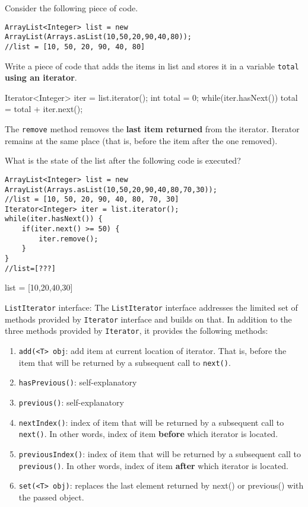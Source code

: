 \begin{questions}
\question Consider the following piece of code.

\begin{lstlisting}
ArrayList<Integer> list = new ArrayList(Arrays.asList(10,50,20,90,40,80));
//list = [10, 50, 20, 90, 40, 80]
\end{lstlisting}

Write a piece of code that adds the items in list and stores it in a variable \texttt{total} \textbf{using an iterator}.

\ifprintanswers
Iterator<Integer> iter = list.iterator();
int total = 0;
while(iter.hasNext()) {
	total = total + iter.next();
}
\else
\fi

\ifprintanswers
\else
\newpage
\fi

\question The \texttt{remove} method removes the \textbf{last item returned} from the iterator. Iterator remains at the same place (that is, before the item after the one removed).

What is the state of the list after the following code is executed?

\begin{lstlisting}
ArrayList<Integer> list = new ArrayList(Arrays.asList(10,50,20,90,40,80,70,30));
//list = [10, 50, 20, 90, 40, 80, 70, 30]
Iterator<Integer> iter = list.iterator();
while(iter.hasNext()) {
	if(iter.next() >= 50) {
		iter.remove();
	}
}
//list=[???]
\end{lstlisting}

\ifprintanswers
list = [10,20,40,30]
\else
\fi

\question \texttt{ListIterator} interface: The \texttt{ListIterator} interface addresses the limited set of methods provided by \texttt{Iterator} interface and builds on that. In addition to the three methods provided by \texttt{Iterator}, it provides the following methods:

\begin{enumerate}
\item \texttt{add(<T> obj}: add item at current location of iterator. That is, before the item that will be returned by a subsequent call to \texttt{next()}.
\item \texttt{hasPrevious()}: self-explanatory
\item \texttt{previous()}: self-explanatory
\item \texttt{nextIndex()}: index of item that will be returned by a subsequent call to \texttt{next()}. In other words, index of item \textbf{before} which iterator is located.
\item \texttt{previousIndex()}: index of item that will be returned by a subsequent call to \texttt{previous()}. In other words, index of item \textbf{after} which iterator is located.
\item \texttt{set(<T> obj)}: replaces the last element returned by next() or previous() with the passed object.
\end{enumerate}



\end{questions}
